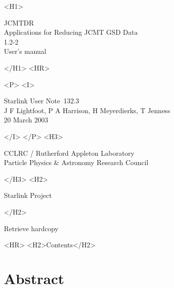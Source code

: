 \documentclass[twoside,11pt]{article}
\newcommand{\stardoccategory}  {Starlink User Note}
\newcommand{\stardocsource}    {sun\stardocnumber}
\newcommand{\stardocnumber}    {132.3}
\newcommand{\stardocauthors}
   {J F Lightfoot, P A Harrison, H Meyerdierks, T Jenness}
\newcommand{\stardocdate}      {20 March 2003}
\newcommand{\stardoctitle}     {JCMTDR \\[2ex] Applications for Reducing JCMT GSD Data}
\newcommand{\stardocversion}   {1.2-2}
\newcommand{\stardocmanual}    {User's manual}
\newcommand{\htmladdnormallink}[2]{#1}
\newcommand{\htmladdimg}[1]{}
\newcommand{\htmlref}[2]{#1}
\newcommand{\htmladdtonavigation}[1]{}
\newcommand{\xlabel}[1]{}
\renewcommand{\_}{\texttt{\symbol{95}}}
\begin{document}
\begin{htmlonly}
   \xlabel{}
   \begin{rawhtml} <H1> \end{rawhtml}
      \stardoctitle\\
      \stardocversion\\
      \stardocmanual
   \begin{rawhtml} </H1> <HR> \end{rawhtml}


   \begin{rawhtml} <P> <I> \end{rawhtml}
   \stardoccategory\ \stardocnumber \\
   \stardocauthors \\
   \stardocdate
   \begin{rawhtml} </I> </P> <H3> \end{rawhtml}
      \htmladdnormallink{CCLRC / Rutherford Appleton Laboratory}
                        {http://www.cclrc.ac.uk} \\
      \htmladdnormallink{Particle Physics \& Astronomy Research Council}
                        {http://www.pparc.ac.uk} \\
   \begin{rawhtml} </H3> <H2> \end{rawhtml}
      \htmladdnormallink{Starlink Project}{http://www.starlink.ac.uk/}
   \begin{rawhtml} </H2> \end{rawhtml}
   \htmladdnormallink{\htmladdimg{source.gif} Retrieve hardcopy}
      {http://www.starlink.ac.uk/cgi-bin/hcserver?\stardocsource}\\

  \label{stardoccontents}
  \begin{rawhtml}
    <HR>
    <H2>Contents</H2>
  \end{rawhtml}
  \htmladdtonavigation{\htmlref{\htmladdimg{contents_motif.gif}}
        {stardoccontents}}

  \section{\xlabel{abstract}Abstract}
\end{htmlonly}
\end{document}

